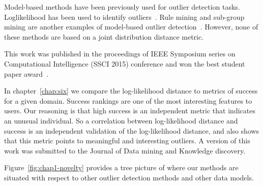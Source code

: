 \begin{enumerate}
 	Model-based methods have been previously used for outlier detection tasks. Loglikelihood has been used to identify outliers~\cite{Cansado2008}. Rule mining and sub-group mining are another examples of model-based outlier detection~\cite{Agrawal1994, Koh2005}. However, none of these methods are based on a joint distribution distance metric.
 	
 		This work was published in the proceedings of IEEE Symposium series on Computational Intelligence (SSCI 2015) conference and won the best student paper award~\cite{Riahi2015}.
 	
 	In chapter~\ref{chap:six} we compare the log-likelihood distance to metrics of success for a given domain. Success rankings are one of the most interesting features to users. Our reasoning is that high success is an independent metric that indicates an unusual individual. So a correlation between log-likelihood distance and success is an independent validation of the log-likelihood distance, and also shows that this metric points to meaningful and interesting outliers. A version of this work was submitted to the Journal of Data mining and Knowledge discovery.
 \end{enumerate}
   	Figure~\ref{fig:chap1-novelty} provides a tree picture of where our methods are situated with respect to other outlier detection methods and other data models.
   	
